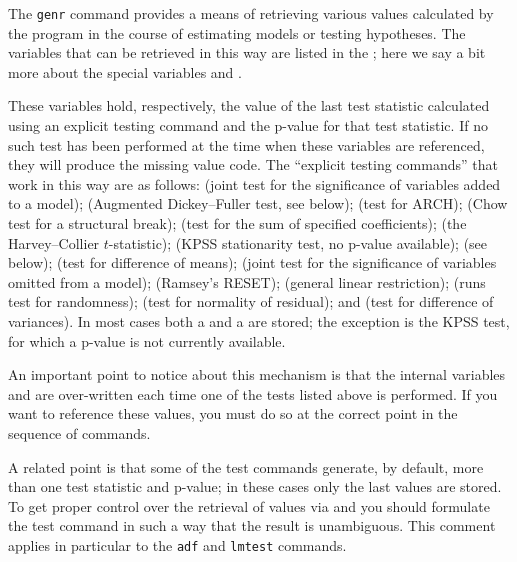 The \verb+genr+ command provides a means of retrieving various values
calculated by the program in the course of estimating models or
testing hypotheses.  The variables that can be retrieved in this way
are listed in the \GCR; here we say a bit more about the special
variables  and .

These variables hold, respectively, the value of the last test
statistic calculated using an explicit testing command and the p-value
for that test statistic.  If no such test has been performed at the
time when these variables are referenced, they will produce the
missing value code.  The ``explicit testing commands'' that work in
this way are as follows:  (joint test for the significance of
variables added to a model);  (Augmented Dickey--Fuller test,
see below);  (test for ARCH);  (Chow test for a
structural break);  (test for the sum of specified
coefficients);  (the Harvey--Collier $t$-statistic);
 (KPSS stationarity test, no p-value available);
 (see below);  (test for difference of
means);  (joint test for the significance of variables
omitted from a model);  (Ramsey's RESET); 
(general linear restriction);  (runs test for randomness);
 (test for normality of residual); and 
(test for difference of variances). In most cases both a 
and a  are stored; the exception is the KPSS test, for
which a p-value is not currently available.
    
An important point to notice about this mechanism is that the internal
variables  and  are over-written each time
one of the tests listed above is performed.  If you want to reference
these values, you must do so at the correct point in the sequence of
 commands.  

A related point is that some of the test commands generate, by
default, more than one test statistic and p-value; in these cases only
the last values are stored. To get proper control over the retrieval
of values via  and  you should formulate the
test command in such a way that the result is unambiguous.  This
comment applies in particular to the \verb+adf+ and \verb+lmtest+
commands.

